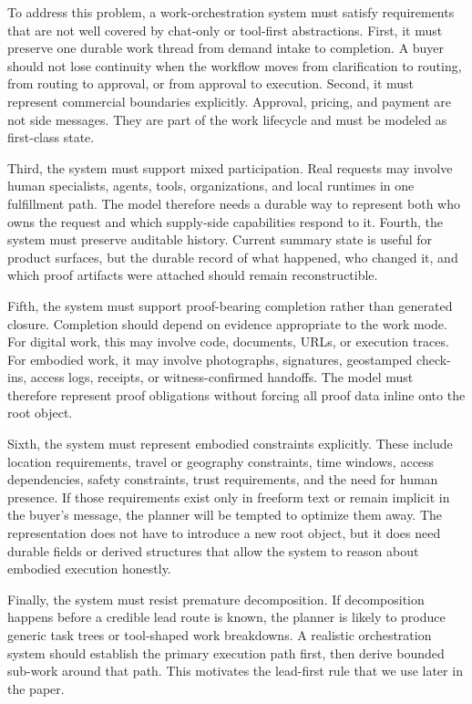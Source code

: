 To address this problem, a work-orchestration system must satisfy requirements that are not well covered by chat-only or tool-first abstractions. First, it must preserve one durable work thread from demand intake to completion. A buyer should not lose continuity when the workflow moves from clarification to routing, from routing to approval, or from approval to execution. Second, it must represent commercial boundaries explicitly. Approval, pricing, and payment are not side messages. They are part of the work lifecycle and must be modeled as first-class state.

Third, the system must support mixed participation. Real requests may involve human specialists, agents, tools, organizations, and local runtimes in one fulfillment path. The model therefore needs a durable way to represent both who owns the request and which supply-side capabilities respond to it. Fourth, the system must preserve auditable history. Current summary state is useful for product surfaces, but the durable record of what happened, who changed it, and which proof artifacts were attached should remain reconstructible.

Fifth, the system must support proof-bearing completion rather than generated closure. Completion should depend on evidence appropriate to the work mode. For digital work, this may involve code, documents, URLs, or execution traces. For embodied work, it may involve photographs, signatures, geostamped check-ins, access logs, receipts, or witness-confirmed handoffs. The model must therefore represent proof obligations without forcing all proof data inline onto the root object.

Sixth, the system must represent embodied constraints explicitly. These include location requirements, travel or geography constraints, time windows, access dependencies, safety constraints, trust requirements, and the need for human presence. If those requirements exist only in freeform text or remain implicit in the buyer's message, the planner will be tempted to optimize them away. The representation does not have to introduce a new root object, but it does need durable fields or derived structures that allow the system to reason about embodied execution honestly.

Finally, the system must resist premature decomposition. If decomposition happens before a credible lead route is known, the planner is likely to produce generic task trees or tool-shaped work breakdowns. A realistic orchestration system should establish the primary execution path first, then derive bounded sub-work around that path. This motivates the lead-first rule that we use later in the paper.
